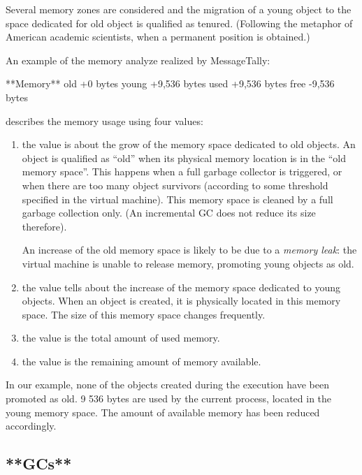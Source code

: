 \documentclass[a4paper,10pt,twoside]{book}
\begin{document}
Several memory zones are considered and the migration of a young object to the space dedicated for old object is qualified as tenured. (Following the metaphor of American academic scientists, when a permanent position is obtained.)

An example of the memory analyze realized by MessageTally: 

\begin{code}

**Memory**
	old			+0 bytes
	young		+9,536 bytes
	used		+9,536 bytes
	free		-9,536 bytes
\end{code}

 describes the memory usage using four values:

\begin{enumerate}

\item the  value is about the grow of the memory space dedicated to old objects. An object is qualified as ``old'' when its physical memory location is in the ``old memory space''. This happens when a full garbage collector is triggered, or when there are too many object survivors (according to some threshold specified in the virtual machine). This memory space is cleaned by a full garbage collection only. (An incremental GC does not reduce its size therefore). 

An increase of the old memory space is likely to be due to a \emph{memory leak}: the virtual machine is unable to release memory, promoting young objects as old.

\item the  value tells about the increase of the memory space dedicated to young objects. When an object is created, it is physically located in this memory space. The size of this memory space changes frequently. 

\item the  value is the total amount of used memory.

\item the  value is the remaining amount of memory available.
\end{enumerate}

In our example, none of the objects created during the execution have been promoted as old. 9 536 bytes are used by the current process, located in the young memory space. The amount of available memory has been reduced accordingly.

\subsection{**GCs**}
\end{document}
